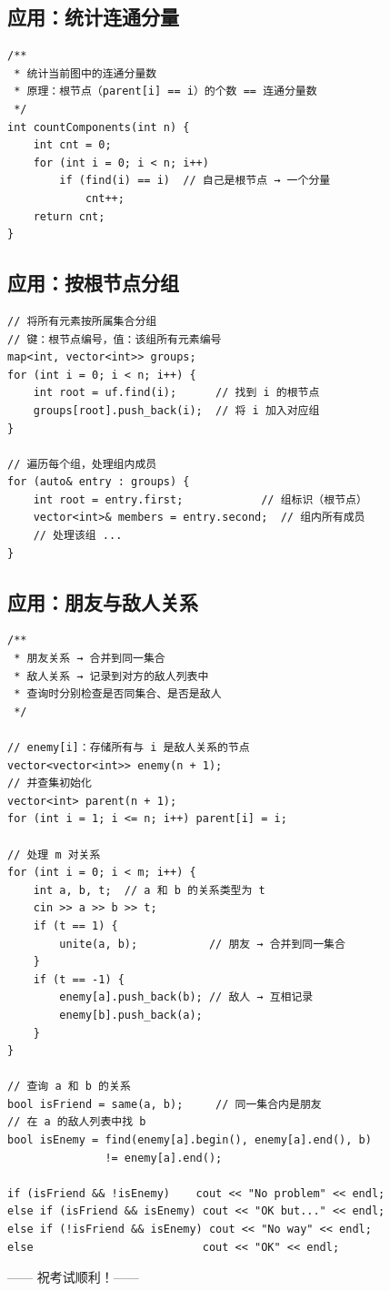 \documentclass[12pt,a4paper]{article}
\begin{document}
\subsection{应用：统计连通分量}

\begin{lstlisting}
/**
 * 统计当前图中的连通分量数
 * 原理：根节点（parent[i] == i）的个数 == 连通分量数
 */
int countComponents(int n) {
    int cnt = 0;
    for (int i = 0; i < n; i++)
        if (find(i) == i)  // 自己是根节点 → 一个分量
            cnt++;
    return cnt;
}
\end{lstlisting}

\subsection{应用：按根节点分组}

\begin{lstlisting}
// 将所有元素按所属集合分组
// 键：根节点编号，值：该组所有元素编号
map<int, vector<int>> groups;
for (int i = 0; i < n; i++) {
    int root = uf.find(i);      // 找到 i 的根节点
    groups[root].push_back(i);  // 将 i 加入对应组
}

// 遍历每个组，处理组内成员
for (auto& entry : groups) {
    int root = entry.first;            // 组标识（根节点）
    vector<int>& members = entry.second;  // 组内所有成员
    // 处理该组 ...
}
\end{lstlisting}

\subsection{应用：朋友与敌人关系}

\begin{lstlisting}
/**
 * 朋友关系 → 合并到同一集合
 * 敌人关系 → 记录到对方的敌人列表中
 * 查询时分别检查是否同集合、是否是敌人
 */

// enemy[i]：存储所有与 i 是敌人关系的节点
vector<vector<int>> enemy(n + 1);
// 并查集初始化
vector<int> parent(n + 1);
for (int i = 1; i <= n; i++) parent[i] = i;

// 处理 m 对关系
for (int i = 0; i < m; i++) {
    int a, b, t;  // a 和 b 的关系类型为 t
    cin >> a >> b >> t;
    if (t == 1) {
        unite(a, b);           // 朋友 → 合并到同一集合
    }
    if (t == -1) {
        enemy[a].push_back(b); // 敌人 → 互相记录
        enemy[b].push_back(a);
    }
}

// 查询 a 和 b 的关系
bool isFriend = same(a, b);     // 同一集合内是朋友
// 在 a 的敌人列表中找 b
bool isEnemy = find(enemy[a].begin(), enemy[a].end(), b)
               != enemy[a].end();

if (isFriend && !isEnemy)    cout << "No problem" << endl;
else if (isFriend && isEnemy) cout << "OK but..." << endl;
else if (!isFriend && isEnemy) cout << "No way" << endl;
else                          cout << "OK" << endl;
\end{lstlisting}

\vfill
\begin{flushright}
\small —— 祝考试顺利！——
\end{flushright}
\end{document}
